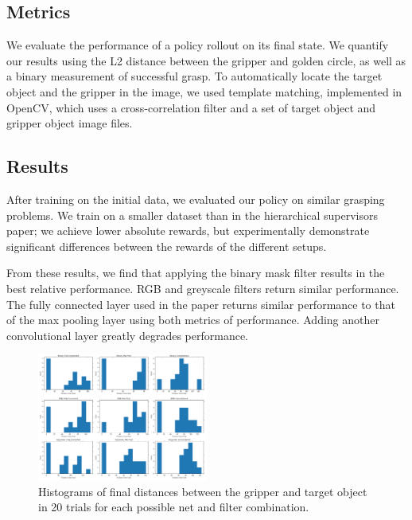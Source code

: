 \documentclass[10pt, conference]{ieeeconf}      %
\begin{document}
\subsection{Metrics}
We evaluate the performance of a policy rollout on its final state.
We quantify our results using the L2 distance between the gripper and golden circle, as well as a binary measurement of successful grasp. To automatically locate the target object and the gripper in the image, we used template matching, implemented in OpenCV, which uses a cross-correlation filter and a set of target object and gripper object image files.  

\subsection{Results}
After training on the initial data, we evaluated our policy on similar grasping problems. We train on a smaller dataset than in the hierarchical supervisors paper;  we achieve lower absolute rewards, but experimentally demonstrate significant differences between the rewards of the different setups. 

From these results, we find that applying the binary mask filter results in the best relative performance. RGB and greyscale filters return similar performance.
The fully connected layer used in the paper returns similar performance to that of the max pooling layer using both metrics of performance. Adding another convolutional layer greatly degrades performance.

\begin{figure}[t]
\centering

\includegraphics[width=0.5\textwidth]{f_figs/results_histograms.png}

\caption{\footnotesize Histograms of final distances between the gripper and target object in 20 trials for each possible net and filter combination.}

\label{fig:results_histograms}
\end{figure}
\end{document}
